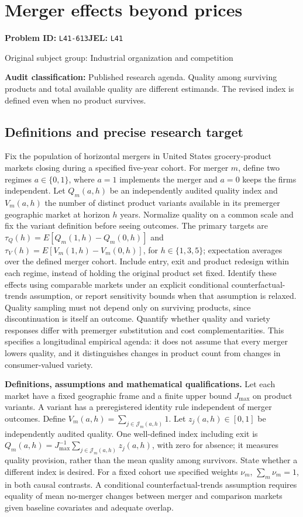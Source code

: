 \documentclass[11pt,a4paper]{article}
\begin{document}
\section*{Merger effects beyond prices}
\textbf{Problem ID:} \texttt{L41-613}\quad \textbf{JEL:} \texttt{L41}\par
\label{problem:OP-0393}
{\sffamily\small\color{muted}Original subject group: Industrial organization and competition\par}
\label{definitions:problem:30007675}
\textbf{Audit classification:} Published research agenda. Quality among surviving products and total available quality are different estimands. The revised index is defined even when no product survives.
\subsection*{Definitions and precise research target}
Fix the population of horizontal mergers in United States grocery-product markets closing during a specified five-year cohort. For merger \(m\), define two regimes \(a\in\{0,1\}\), where \(a=1\) implements the merger and \(a=0\) keeps the firms independent. Let \(Q_m(a,h)\) be an independently audited quality index and \(V_m(a,h)\) the number of distinct product variants available in its premerger geographic market at horizon \(h\) years. Normalize quality on a common scale and fix the variant definition before seeing outcomes. The primary targets are \(\tau_Q(h)=E[Q_m(1,h)-Q_m(0,h)]\) and \(\tau_V(h)=E[V_m(1,h)-V_m(0,h)]\), for \(h\in\{1,3,5\}\); expectation averages over the defined merger cohort. Include entry, exit and product redesign within each regime, instead of holding the original product set fixed. Identify these effects using comparable markets under an explicit conditional counterfactual-trends assumption, or report sensitivity bounds when that assumption is relaxed. Quality sampling must not depend only on surviving products, since discontinuation is itself an outcome. Quantify whether quality and variety responses differ with premerger substitution and cost complementarities. This specifies a longitudinal empirical agenda: it does not assume that every merger lowers quality, and it distinguishes changes in product count from changes in consumer-valued variety.

\textbf{Definitions, assumptions and mathematical qualifications.} Let each market have a fixed geographic frame and a finite upper bound \(J_{\max}\) on product variants. A variant has a preregistered identity rule independent of merger outcomes. Define \(V_m(a,h)=\sum_{j\in\mathcal J_m(a,h)}1\). Let \(z_j(a,h)\in[0,1]\) be independently audited quality. One well-defined index including exit is \(Q_m(a,h)=J_{\max}^{-1}\sum_{j\in\mathcal J_m(a,h)}z_j(a,h)\), with zero for absence; it measures quality provision, rather than the mean quality among survivors. State whether a different index is desired. For a fixed cohort use specified weights \(\nu_m\), \(\sum_m\nu_m=1\), in both causal contrasts. A conditional counterfactual-trends assumption requires equality of mean no-merger changes between merger and comparison markets given baseline covariates and adequate overlap.
\end{document}
